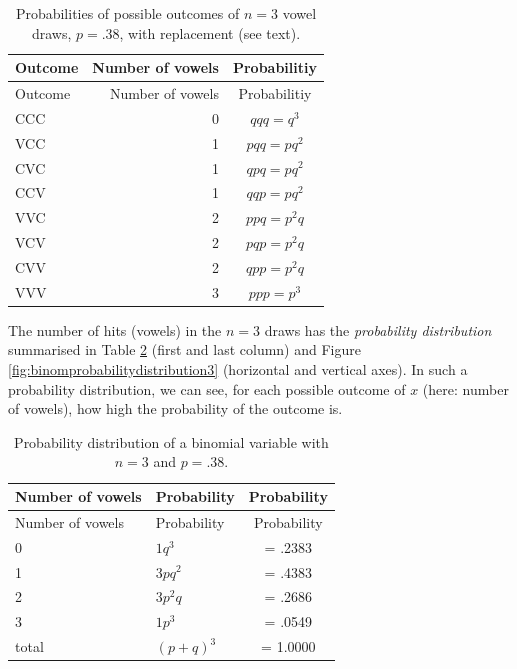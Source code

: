 \documentclass[
]{book}
\begin{document}
\begin{longtable}[]{@{}lrc@{}}
\caption{\label{tab:vowelprobabilities} Probabilities of possible outcomes of \(n=3\)
vowel draws, \(p=.38\), with replacement (see text).}\tabularnewline
\toprule
Outcome & Number of vowels & Probabilitiy \\
\midrule
\endfirsthead
\toprule
Outcome & Number of vowels & Probabilitiy \\
\midrule
\endhead
CCC & 0 & \(qqq = q^3\) \\
VCC & 1 & \(pqq = pq^2\) \\
CVC & 1 & \(qpq = pq^2\) \\
CCV & 1 & \(qqp = pq^2\) \\
VVC & 2 & \(ppq = p^2q\) \\
VCV & 2 & \(pqp = p^2q\) \\
CVV & 2 & \(qpp = p^2q\) \\
VVV & 3 & \(ppp = p^3\) \\
\bottomrule
\end{longtable}

The number of hits (vowels) in the \(n=3\) draws has the
\emph{probability distribution} summarised in
Table \ref{tab:binomprobabilitydistribution3} (first and last column) and
Figure \ref{fig:binomprobabilitydistribution3} (horizontal and vertical axes).
In such a probability distribution, we can see, for each possible outcome of \(x\)
(here: number of vowels), how high the probability of the outcome is.

\begin{longtable}[]{@{}llc@{}}
\caption{\label{tab:binomprobabilitydistribution3} Probability distribution of a
binomial variable with \(n=3\) and \(p=.38\).}\tabularnewline
\toprule
Number of vowels & Probability & Probability \\
\midrule
\endfirsthead
\toprule
Number of vowels & Probability & Probability \\
\midrule
\endhead
0 & \(1 q^3\) & = .2383 \\
1 & \(3 p q^2\) & = .4383 \\
2 & \(3 p^2 q\) & = .2686 \\
3 & \(1 p^3\) & = .0549 \\
total & \((p+q)^3\) & = 1.0000 \\
\bottomrule
\end{longtable}
\end{document}
